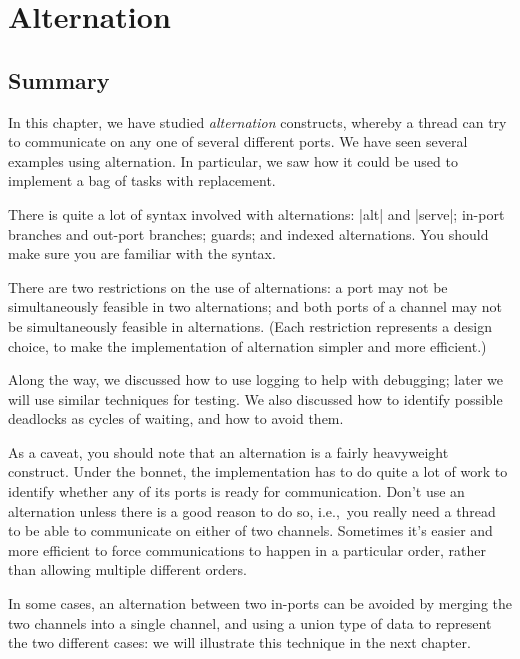 \chapter{Alternation} 
\label{chap:alts}



\section{Summary}

In this chapter, we have studied \emph{alternation} constructs, whereby a
thread can try to communicate on any one of several different ports.  We
have seen several examples using alternation.  In particular, we saw how it
could be used to implement a bag of tasks with replacement. 

There is quite a lot of syntax involved with alternations: |alt| and |serve|;
in-port branches and out-port branches; guards; and indexed alternations.  You
should make sure you are familiar with the syntax.

There are two restrictions on the use of alternations: a port may not be
simultaneously feasible in two alternations; and both ports of a channel may
not be simultaneously feasible in alternations.  (Each restriction represents
a design choice, to make the implementation of alternation simpler and more
efficient.)

Along the way, we discussed how to use logging to help with debugging; later
we will use similar techniques for testing.  We also discussed how to identify
possible deadlocks as cycles of waiting, and how to avoid them.

As a caveat, you should note that an alternation is a fairly heavyweight
construct.  Under the bonnet, the implementation has to do quite a lot of
work to identify whether any of its ports is ready for communication.  Don't
use an alternation unless there is a good reason to do so, i.e.,~you really
need a thread to be able to communicate on either of two channels.  
 Sometimes it's easier and more efficient to force
communications to happen in a particular order, rather than allowing multiple
different orders.

In some cases, an alternation between two in-ports can be avoided by merging
the two channels into a single channel, and using a union type of data to
represent the two different cases: we will illustrate this technique in the
next chapter.


